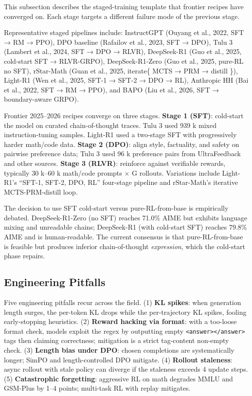 \documentclass{article}
\begin{document}
This subsection describes the staged-training template that frontier recipes have converged on. Each stage targets a different failure mode of the previous stage.

Representative staged pipelines include: InstructGPT (Ouyang et al., 2022, SFT → RM → PPO), DPO baseline (Rafailov et al., 2023, SFT → DPO), Tulu 3 (Lambert et al., 2024, SFT → DPO → RLVR), DeepSeek-R1 (Guo et al., 2025, cold-start SFT → RLVR-GRPO), DeepSeek-R1-Zero (Guo et al., 2025, pure-RL no SFT), rStar-Math (Guan et al., 2025, iterate\{ MCTS → PRM → distill \}), Light-R1 (Wen et al., 2025, SFT-1 → SFT-2 → DPO → RL), Anthropic HH (Bai et al., 2022, SFT → RM → PPO), and BAPO (Liu et al., 2026, SFT → boundary-aware GRPO).

Frontier 2025--2026 recipes converge on three stages. \textbf{Stage 1 (SFT)}: cold-start the model on curated chain-of-thought traces. Tulu 3 used 939 k mixed instruction-tuning samples. Light-R1 used a two-stage SFT with progressively harder math/code data. \textbf{Stage 2 (DPO)}: align style, factuality, and safety on pairwise preference data; Tulu 3 used 96 k preference pairs from UltraFeedback and other sources. \textbf{Stage 3 (RLVR)}: reinforce against verifiable rewards, typically 30 k--60 k math/code prompts × G rollouts. Variations include Light-R1's ``SFT-1, SFT-2, DPO, RL'' four-stage pipeline and rStar-Math's iterative MCTS-PRM-distill loop.

The decision to use SFT cold-start versus pure-RL-from-base is empirically debated. DeepSeek-R1-Zero (no SFT) reaches 71.0\% AIME but exhibits language mixing and unreadable chains; DeepSeek-R1 (with cold-start SFT) reaches 79.8\% AIME and is human-readable. The current consensus is that pure-RL-from-base is feasible but produces inferior chain-of-thought \emph{expression}, which the cold-start phase repairs.

\subsection{Engineering Pitfalls}\label{engineering-pitfalls}

Five engineering pitfalls recur across the field. (1) \textbf{KL spikes}: when generation length surges, the per-token KL drops while the per-trajectory KL spikes, fooling early-stopping heuristics. (2) \textbf{Reward hacking via format}: with a too-loose format check, models exploit the regex by outputting empty \texttt{\textless{}answer\textgreater{}\textless{}/answer\textgreater{}} tags then claiming correctness; mitigation is a strict tag-content non-empty check. (3) \textbf{Length bias under DPO}: chosen completions are systematically longer; SimPO and length-controlled DPO mitigate. (4) \textbf{Rollout staleness}: async rollout with stale policy can diverge if the staleness exceeds 4 update steps. (5) \textbf{Catastrophic forgetting}: aggressive RL on math degrades MMLU and GSM-Plus by 1--4 points; multi-task RL with replay mitigates.
\end{document}
